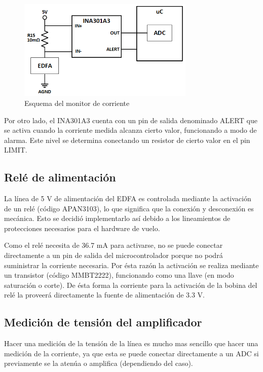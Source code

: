 \begin{figure}[H]
\centering
\includegraphics[width=0.75\textwidth]{./Figures/func_monitor.png}
\caption{Esquema del monitor de corriente}
\label{fig:funcMonitor}
\end{figure}

Por otro lado, el INA301A3 cuenta con un pin de salida denominado ALERT que se activa cuando la corriente medida alcanza cierto valor, funcionando a modo de alarma. Este nivel se determina conectando un resistor de cierto valor en el pin LIMIT.

\subsection{Relé de alimentación}

La línea de 5 V de alimentación del EDFA es controlada mediante la activación de un relé (código APAN3103), lo que significa que la conexión y desconexión es mecánica. Esto se decidió implementarlo así debido a los lineamientos de protecciones necesarios para el hardware de vuelo.

Como el relé necesita de 36.7 mA para activarse, no se puede conectar directamente a un pin de salida del microcontrolador porque no podrá suministrar la corriente necesaria. Por ésta razón la activación se realiza mediante un transistor (código MMBT2222), funcionando como una llave (en modo saturación o corte). De ésta forma la corriente para la activación de la bobina del relé la proveerá directamente la fuente de alimentación de 3.3 V.

\subsection{Medición de tensión del amplificador}

Hacer una medición de la tensión de la línea es mucho mas sencillo que hacer una medición de la corriente, ya que esta se puede conectar directamente a un ADC si previamente se la atenúa o amplifica (dependiendo del caso).

